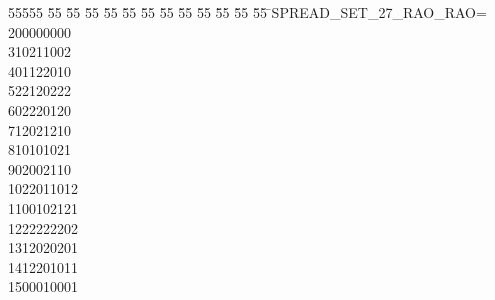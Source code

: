 %
%
\begin{tabbing}
55555 \= 55 \= 55 \= 55 \= 55 \= 55 \= 55 \= 55 \= 55 \= 55 \= 55 \= 55 \= 55 \= \>SPREAD\_SET\_27\_RAO\_RAO=\\[0pt]
200000000\ \\[0pt]
310211002\ \\[0pt]
401122010\ \\[0pt]
522120222\ \\[0pt]
602220120\ \\[0pt]
712021210\ \\[0pt]
810101021\ \\[0pt]
902002110\ \\[0pt]
1022011012\ \\[0pt]
1100102121\ \\[0pt]
1222222202\ \\[0pt]
1312020201\ \\[0pt]
1412201011\ \\[0pt]
1500010001\ \\[0pt]

\end{tabbing}
